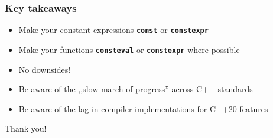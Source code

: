 \documentclass[aspectratio=169]{beamer}
\newcommand{\cpp}[1]{\texttt{\textbf{\textcolor{clCodeBlue}{#1}}}}
\begin{document}
\begin{frame}
\frametitle{Key takeaways}
{\centering
\begin{itemize}
  \item{Make your constant expressions \cpp{const} or \cpp{constexpr}}
  \item{Make your functions \cpp{consteval} or \cpp{constexpr} where possible}
  \item{No downsides!}
  \item{Be aware of the ,,slow march of progress'' across C++ standards}
  \item{Be aware of the lag in compiler implementations for C++20 features}
\end{itemize}

\vspace{2ex}
\begin{center}{\Large Thank you!}\end{center}
}
\end{frame}
\end{document}
